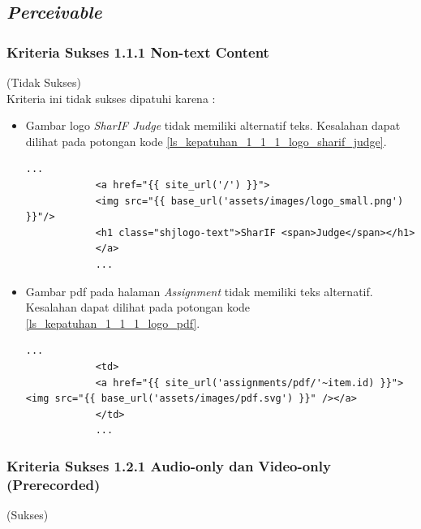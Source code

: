 \documentclass[a4paper,twoside]{article}
\begin{document}
\begin{enumerate}
		\subsection*{\textit{Perceivable}}
		\label{subsec:kepatuhan_perceivable}
		
		\subsubsection*{Kriteria Sukses 1.1.1 Non-text Content}
		\label{subsubsec:kepatuhan_kriteria_1.1.1}
		(Tidak Sukses) \\
		
		Kriteria ini tidak sukses dipatuhi karena :
		\begin{itemize}
			\item Gambar logo \textit{SharIF Judge} tidak memiliki alternatif teks. Kesalahan dapat dilihat pada potongan kode \ref{ls_kepatuhan_1_1_1_logo_sharif_judge}.
			\begin{lstlisting}[basicstyle=\ttfamily, frame=single,
			columns=fullflexible, keepspaces=true, breaklines=true, label=ls_kepatuhan_1_1_1_logo_sharif_judge, caption=Kriteria Sukses 1.1.1 - Logo SharIF Judge Tidak Diberi Teks Alternatif]
			...
			<a href="{{ site_url('/') }}">
			<img src="{{ base_url('assets/images/logo_small.png') }}"/>
			<h1 class="shjlogo-text">SharIF <span>Judge</span></h1>
			</a>
			...
			\end{lstlisting}
			\item Gambar pdf pada halaman \textit{Assignment} tidak memiliki teks alternatif. Kesalahan dapat dilihat pada potongan kode \ref{ls_kepatuhan_1_1_1_logo_pdf}.
			\begin{lstlisting}[basicstyle=\ttfamily, frame=single,
			columns=fullflexible, keepspaces=true, breaklines=true, label=ls_kepatuhan_1_1_1_logo_pdf, caption=Kriteria Sukses 1.1.1 - Gambar PDF Tidak Diberi Teks Alternatif]
			...
			<td>
			<a href="{{ site_url('assignments/pdf/'~item.id) }}"><img src="{{ base_url('assets/images/pdf.svg') }}" /></a>
			</td>
			...
			\end{lstlisting}
		\end{itemize}
		
		\subsubsection*{Kriteria Sukses 1.2.1 Audio-only dan Video-only (Prerecorded)}
		\label{subsubsec:kepatuhan_kriteria_1.2.1}
		(Sukses) \\
		

\end{enumerate}
\end{document}
